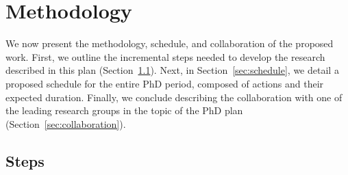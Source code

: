 \chapter{Methodology}\label{cap:methodology}
\thispagestyle{empty}

We now present the methodology, schedule, and collaboration of the proposed work. First, we outline the incremental steps needed to develop the research described in this plan (Section~\ref{sec:steps}). Next, in Section~\ref{sec:schedule}, we detail a proposed schedule for the entire PhD period, composed of actions and their expected duration. Finally, we conclude describing the collaboration with one of the leading research groups in the topic of the PhD plan (Section~\ref{sec:collaboration}). 

\section{Steps}
\label{sec:steps}

